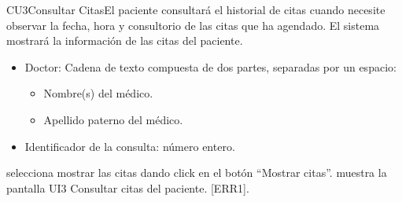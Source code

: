 \begin{UseCase}{CU3}{Consultar Citas}{El paciente consultará el historial de citas cuando necesite observar la fecha, hora y consultorio de las citas que ha agendado. El sistema mostrará la información de las citas del paciente.}
{\begin{itemize}
\begin{itemize}
				\item Doctor: Cadena de texto compuesta de dos partes, separadas por un espacio:
				\begin{itemize}
					\item Nombre(s) del médico.
					\item Apellido paterno del médico.
		        \end{itemize}
		        \item Identificador de la consulta: número entero.
		    \end{itemize}
		\end{itemize}
	}
	
	
\end{UseCase}

\begin{UCtrayectoria}{}
		\UCpaso[\UCactor] selecciona mostrar las citas dando click en el botón ``Mostrar citas''.
		\UCpaso muestra la pantalla UI3 Consultar citas del paciente. [ERR1].
\end{UCtrayectoria}
